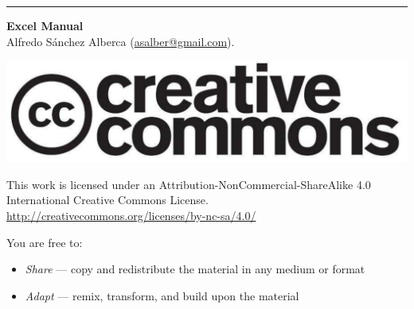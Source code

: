 \thispagestyle{empty}
\null
\vfill
\hrule depth 3pt
\smallskip
\sffamily
\noindent \textbf{Excel Manual}\\
Alfredo Sánchez Alberca (\url{asalber@gmail.com}).
\smallskip

\begin{center}
\includegraphics[scale=0.1]{../img/cc-logo}
\end{center}

\smallskip

\small
This work is licensed under an Attribution-NonCommercial-ShareAlike 4.0 International Creative Commons License. 
\url{http://creativecommons.org/licenses/by-nc-sa/4.0/}

\smallskip

You are free to:
\begin{itemize}
\item \emph{Share} — copy and redistribute the material in any medium or format
\item \emph{Adapt} — remix, transform, and build upon the material
\end{itemize}

